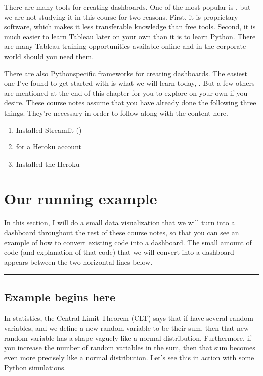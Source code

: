 \documentclass[letterpaper,10pt,english]{sphinxmanual}
\begin{document}
There are many tools for creating dashboards.  One of the most popular is , but we are not studying it in this course for two reasons.  First, it is proprietary software, which makes it less transferable knowledge than free tools.  Second, it is much easier to learn Tableau later on your own than it is to learn Python.  There are many Tableau training opportunities available online and in the corporate world should you need them.

There are also Python\sphinxhyphen{}specific frameworks for creating dashboards.  The easiest one I’ve found to get started with is what we will learn today, .  But a few others are mentioned at the end of this chapter for you to explore on your own if you desire.  These course notes assume that you have already done the following three things.  They’re necessary in order to follow along with the content here.
\begin{enumerate}
%
\item {} 
Installed Streamlit ()

\item {} 
 for a Heroku account

\item {} 
Installed the Heroku 

\end{enumerate}


\section{Our running example}
\label{\detokenize{chapter-14-dashboards:our-running-example}}
In this section, I will do a small data visualization that we will turn into a dashboard throughout the rest of these course notes, so that you can see an example of how to convert existing code into a dashboard.  The small amount of code (and explanation of that code) that we will convert into a dashboard appears between the two horizontal lines below.


\bigskip\hrule\bigskip



\subsection{Example begins here}
\label{\detokenize{chapter-14-dashboards:example-begins-here}}
In statistics, the Central Limit Theorem (CLT) says that if have several random variables, and we define a new random variable to be their sum, then that new random variable has a shape vaguely like a normal distribution.  Furthermore, if you increase the number of random variables in the sum, then that sum becomes even more precisely like a normal distribution.  Let’s see this in action with some Python simulations.
\end{document}
